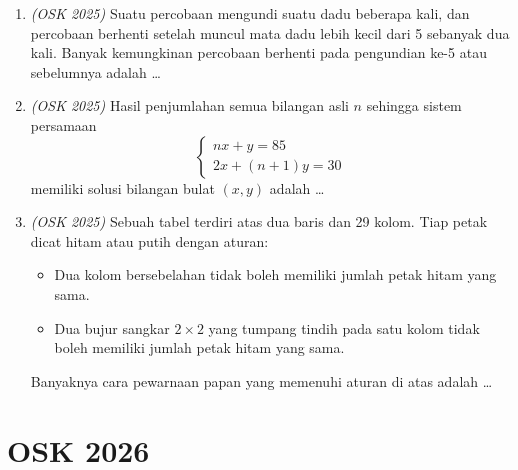 \documentclass[11pt]{scrartcl}
\begin{document}
\begin{enumerate}
\item \textit{(OSK 2025)} Suatu percobaan mengundi suatu dadu beberapa kali, dan percobaan berhenti setelah muncul mata dadu lebih kecil dari 5 sebanyak dua kali. Banyak kemungkinan percobaan berhenti pada pengundian ke-5 atau sebelumnya adalah \dots

\item \textit{(OSK 2025)} Hasil penjumlahan semua bilangan asli $n$ sehingga sistem persamaan
\[
\begin{cases}
nx + y = 85 \\
2x + (n+1)y = 30
\end{cases}
\]
memiliki solusi bilangan bulat $(x,y)$ adalah \dots

\item \textit{(OSK 2025)} Sebuah tabel terdiri atas dua baris dan 29 kolom. Tiap petak dicat hitam atau putih dengan aturan:
\begin{itemize}
\item[(i)] Dua kolom bersebelahan tidak boleh memiliki jumlah petak hitam yang sama.
\item[(ii)] Dua bujur sangkar $2\times 2$ yang tumpang tindih pada satu kolom tidak boleh memiliki jumlah petak hitam yang sama.
\end{itemize}
Banyaknya cara pewarnaan papan yang memenuhi aturan di atas adalah \dots
\end{enumerate}
\newpage

\section{OSK 2026}
\end{document}
